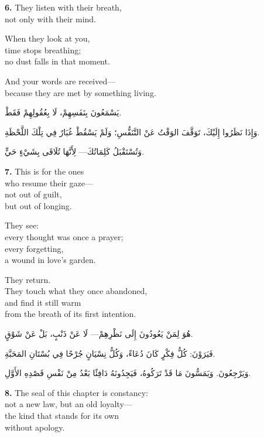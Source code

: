 \documentclass[11pt,a4paper,twoside]{book}
\begin{document}
\vspace{1em}
{\color{indigo}\bfseries 6.}\quad
They listen with their breath,\\
not only with their mind.

When they look at you,\\
time stops breathing;\\
no dust falls in that moment.

And your words are received—\\
because they are met by something living.

\begin{flushright}
{\arabicfont
يَسْمَعُونَ بِنَفَسِهِمْ،
لَا بِعُقُولِهِمْ فَقَطْ.

وَإِذَا نَظَرُوا إِلَيْكَ،
تَوَقَّفَ الوَقْتُ عَنْ التَّنَفُّسِ؛
وَلَمْ يَسْقُطْ غُبَارٌ فِي تِلْكَ اللَّحْظَةِ.

وَتُسْتَقْبَلُ كَلِمَاتُكَ—
لِأَنَّهَا تُلَاقَى
بِشَيْءٍ حَيٍّ.}
\end{flushright}

\vspace{1em}
{\color{indigo}\bfseries 7.}\quad
This is for the ones\\
who resume their gaze—\\
not out of guilt,\\
but out of longing.

They see:\\
every thought was once a prayer;\\
every forgetting,\\
a wound in love's garden.

They return.\\
They touch what they once abandoned,\\
and find it still warm\\
from the breath of its first intention.

\begin{flushright}
{\arabicfont
هُوَ لِمَنْ يَعُودُونَ إِلَى نَظْرِهِمْ—
لَا عَنْ ذَنْبٍ،
بَلْ عَنْ شَوْقٍ.

فَيَرَوْنَ:
كُلُّ فِكْرٍ كَانَ دُعَاءً،
وَكُلُّ نِسْيَانٍ
جُرْحًا فِي بُسْتَانِ المَحَبَّةِ.

وَيَرْجِعُونَ.
وَيَمَسُّونَ مَا قَدْ تَرَكُوهُ،
فَيَجِدُونَهُ دَافِئًا بَعْدُ
مِنْ نَفْسِ قَصْدِهِ الأَوَّلِ.}
\end{flushright}

\vspace{1em}
{\color{indigo}\bfseries 8.}\quad
The seal of this chapter is constancy:\\
not a new law, but an old loyalty—\\
the kind that stands for its own\\
without apology.
\end{document}
